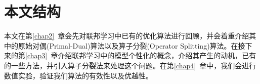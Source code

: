 \section{本文结构}
\label{sec:chap1-structure}

本文在第\ref{chap2}~章会先对联邦学习中已有的优化算法进行回顾，并会着重介绍其中的原始对偶(Primal-Dual)算法以及算子分裂(Operator Splitting)算法。在接下来的第\ref{chap3}~章介绍联邦学习中的模型个性化的概念，介绍其产生的动机，已有的一些方法，并引入算子分裂法来处理这个问题。在第\ref{chap4}~章中，我们会进行数值实验，验证我们算法的有效性以及优越性。
